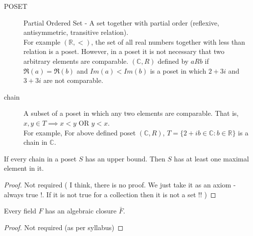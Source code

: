 \begin{description}
	\item[POSET] Partial Ordered Set - A set together with partial order (reflexive, antisymmetric, transitive relation).\\
		
	For example $(\mathbb{R},<)$, the set of all real numbers together with less than relation is a poset. However, in a poset it is not necessary that two arbitrary elements are comparable. $(\mathbb{C},R)$ defined by $aRb$ if $\Re(a) = \Re(b)$ and $Im(a) < Im(b)$ is a poset in which $2+3i$ and $3+3i$ are not comparable.
	\item[chain] A subset of a poset in which any two elements are comparable. That is, $x,y \in T \implies x < y \text{ OR } y < x$.\\

	For example, For above defined poset $(\mathbb{C},R)$, $T = \{ 2+ib \in \mathbb{C} : b \in \mathbb{R} \}$ is a chain in $\mathbb{C}$.
\end{description}
\begin{lemma}[Zorn]
	If every chain in a poset $S$ has an upper bound. Then $S$ has at least one maximal element in it.
\end{lemma}
\begin{proof}
	Not required ( I think, there is no proof. We just take it as an axiom - always true !. If it is not true for a collection then it is not a set !! )
\end{proof}
\begin{theorem}
	Every field $F$ has an algebraic closure $\bar{F}$.
\end{theorem}
\begin{proof}
	Not required (as per syllabus)
\end{proof}

